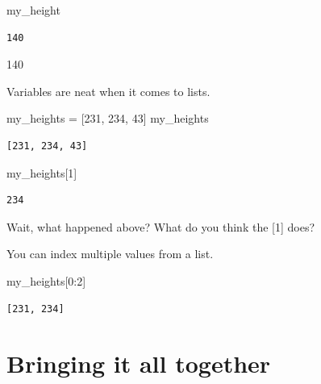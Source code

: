 \documentclass[
  letterpaper,
  DIV=11,
  numbers=noendperiod]{scrreprt}
\newenvironment{Shaded}{\begin{snugshade}}{\end{snugshade}}
\newcommand{\DecValTok}[1]{\textcolor[rgb]{0.68,0.00,0.00}{#1}}
\newcommand{\NormalTok}[1]{\textcolor[rgb]{0.00,0.23,0.31}{#1}}
\newcommand{\OperatorTok}[1]{\textcolor[rgb]{0.37,0.37,0.37}{#1}}
\begin{document}
\begin{Shaded}
\begin{Highlighting}[]
\NormalTok{my\_height}
\end{Highlighting}
\end{Shaded}

\begin{verbatim}
140
\end{verbatim}

140

Variables are neat when it comes to lists.

\begin{Shaded}
\begin{Highlighting}[]
\NormalTok{my\_heights }\OperatorTok{=}\NormalTok{ [}\DecValTok{231}\NormalTok{, }\DecValTok{234}\NormalTok{, }\DecValTok{43}\NormalTok{]}
\NormalTok{my\_heights}
\end{Highlighting}
\end{Shaded}

\begin{verbatim}
[231, 234, 43]
\end{verbatim}

\begin{Shaded}
\begin{Highlighting}[]
\NormalTok{my\_heights[}\DecValTok{1}\NormalTok{]}
\end{Highlighting}
\end{Shaded}

\begin{verbatim}
234
\end{verbatim}

Wait, what happened above? What do you think the {[}1{]} does?

You can index multiple values from a list.

\begin{Shaded}
\begin{Highlighting}[]
\NormalTok{my\_heights[}\DecValTok{0}\NormalTok{:}\DecValTok{2}\NormalTok{]}
\end{Highlighting}
\end{Shaded}

\begin{verbatim}
[231, 234]
\end{verbatim}

\hypertarget{bringing-it-all-together}{%
\section{Bringing it all together}\label{bringing-it-all-together}}
\end{document}
